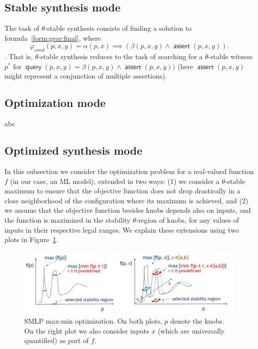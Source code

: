 \documentclass[a4paper,parskip=half]{article} %
\newcommand\changed[1]{{\color{blue}#1}}
\newcommand*\eqdef=
\newcommand*\query{\operatorname{\mathsf{query}}}
\newcommand*\assert{\operatorname{\mathsf{assert}}}
\begin{document}
\subsection{Stable synthesis mode}


The task of $\theta$-stable synthesis consists of finding a solution to formula~\cref{form:gear:final}, where
\[\varphi_{\mathit{cond}}(p,x,y) \eqdef \alpha(p,x) \implies (\beta(p, x, y) \wedge \assert(p,x,y)).\].
That is,  $\theta$-stable synthesis reduces to the task of searching for a $\theta$-stable witness $p^*$ for
$\query(p, x, y) \eqdef \beta(p, x, y) \wedge \assert(p,x,y))$ (here $\assert(p, x, y)$ might represent a conjunction of multiple assertions).



\subsection{Optimization mode}

abc


\subsection{Optimized synthesis mode}



In this subsection we consider the optimization problem for a real-valued function $f$ (in our case, an ML model),
extended in two ways:
(1) we consider a $\theta$-stable maximum to ensure that the objective function  does not drop drastically in a close neighborhood of the configuration where its maximum is achieved, and
(2) we assume that the objective function besides knobs depends also on inputs, and the %
function is maximized in the stability $\theta$-region of knobs, for any values of inputs in their respective legal ranges.
We explain these extensions using two plots in Figure~\ref{smlp_maxmin}.

\begin{figure}[tp]
\center
\includegraphics[width= 0.7\columnwidth]{smlp_maxmin.PNG}
\caption{SMLP max-min optimization. On both plots, $p$ denote the knobs. On the right plot we also consider inputs $x$ (which are universally quantified) as part of $f$.} \label{smlp_maxmin}
\end{figure}
\end{document}
